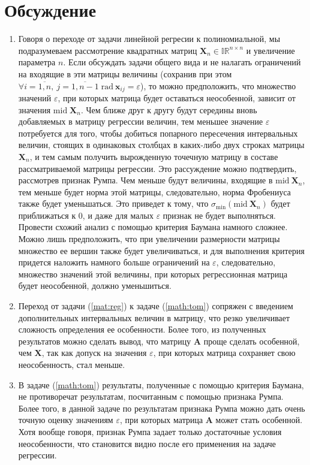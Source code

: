\documentclass[a4paper]{article}
\begin{document}
\section{Обсуждение}
\begin{enumerate}
    \item Говоря о переходе от задачи линейной регресии к полиномиальной, мы подразумеваем рассмотрение квадратных матриц $\mathbf{X}_n\in\mathbb{IR}^{n\times n}$ и увеличение параметра $n$. Если обсуждать задачи общего вида и не налагать ограничений на входящие в эти матрицы величины (сохранив при этом $\forall i=\overline{1,n},\:j=\overline{1,n-1}\;\mathrm{rad}\:\mathbf{x}_{ij}=\varepsilon$), то можно предположить, что множество значений $\varepsilon$, при которых матрица будет оставаться неособенной, зависит от значения $\mathrm{mid}\;\mathbf{X}_n$. Чем ближе друг к другу будут середины вновь добавляемых в матрицу регрессии величин, тем меньшее значение $\varepsilon$ потребуется для того, чтобы добиться попарного пересечения интервальных величин, стоящих в одинаковых столбцах в каких-либо двух строках матрицы $\mathbf{X}_n$, и тем самым получить вырожденную точечную матрицу в составе рассматриваемой матрицы регрессии. Это рассуждение можно подтвердить, рассмотрев признак Румпа. Чем меньше будут величины, входящие в $\mathrm{mid}\:\mathbf{X}_n$, тем меньше будет норма этой матрицы, следовательно, норма Фробениуса также будет уменьшаться. Это приведет к тому, что $\sigma_{\mathrm{min}}(\mathrm{mid}\:\mathbf{X}_n)$ будет приближаться к 0, и даже для малых $\varepsilon$ признак не будет выполняться. Провести схожий анализ с помощью критерия Баумана намного сложнее. Можно лишь предположить, что при увеличении размерности матрицы множество ее вершин также будет увеличиваться, и для выполнения критерия придется наложить намного больше ограничений на $\varepsilon$, следовательно, множество значений этой величины, при которых регрессионная матрица будет неособенной, должно уменьшиться.
    \item Переход от задачи (\ref{mat:reg}) к задаче (\ref{math:tom}) сопряжен с введением дополнительных интервальных величин в матрицу, что резко увеличивает сложность определения ее особенности. Более того, из полученных результатов можно сделать вывод, что матрицу $\mathbf{A}$ проще сделать особенной, чем $\mathbf{X}$, так как допуск на значения $\varepsilon$, при которых матрица сохраняет свою неособенность, стал меньше.
    \item В задаче (\ref{math:tom}) результаты, полученные с помощью критерия Баумана, не противоречат результатам, посчитанным с помощью признака Румпа. Более того, в данной задаче по результатам признака Румпа можно дать очень точную оценку значениям $\varepsilon$, при которых матрица $\mathbf{A}$ может стать особенной. Хотя вообще говоря, признак Румпа задает только достаточные условия неособенности, что становится видно после его применения на задаче регрессии.

\end{enumerate}
\end{document}
